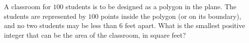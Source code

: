 A classroom for $100$ students is to be designed as a polygon in the plane. The students are represented by $100$ points inside the polygon (or on its boundary), and no two students may be less than $6$ feet apart. What is the smallest positive integer that can be the area of the classroom, in square feet?
